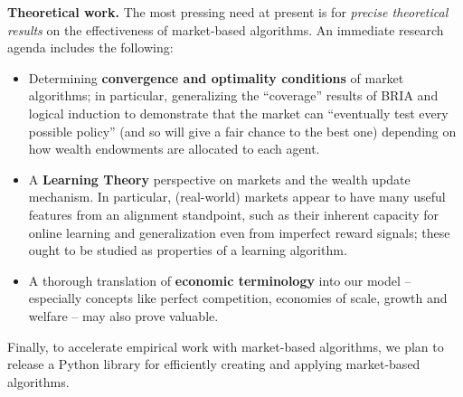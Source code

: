 \textbf{Theoretical work.} The most pressing need at present is for \emph{precise theoretical results} on the effectiveness of market-based algorithms. An immediate research agenda includes the following:

\begin{itemize}
  \item Determining \textbf{convergence and optimality conditions} of market algorithms; in particular, generalizing the ``coverage'' results of BRIA \citep{oesterheldTheoryBoundedInductive2023} and logical induction \citep{garrabrantLogicalInduction2020} to demonstrate that the market can ``eventually test every possible policy'' (and so will give a fair chance to the best one) depending on how wealth endowments are allocated to each agent.
  \item A \textbf{Learning Theory} perspective on markets and the wealth update mechanism. In particular, (real-world) markets appear to have many useful features from an alignment standpoint, such as their inherent capacity for online learning and generalization even from imperfect reward signals; these ought to be studied as properties of a learning algorithm. %
  \item A thorough translation of \textbf{economic terminology} into our model -- especially concepts like perfect competition, economies of scale, growth and welfare -- may also prove valuable.
\end{itemize}

Finally, to accelerate empirical work with market-based algorithms, we plan to release a Python library for efficiently creating and applying market-based algorithms.






